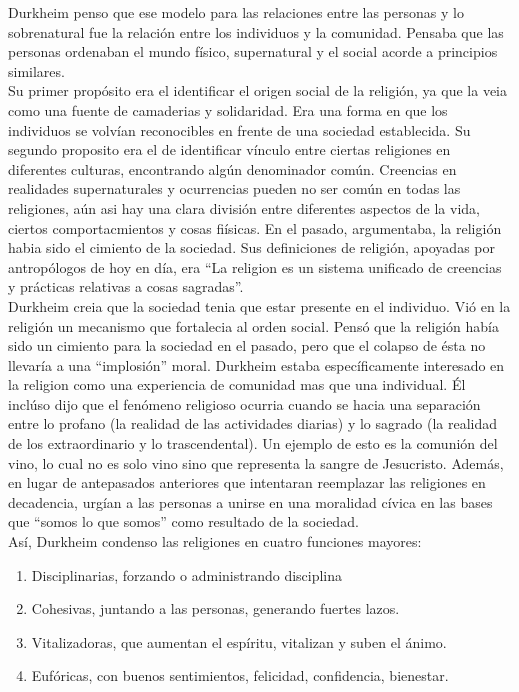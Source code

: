 Durkheim penso que ese modelo para las relaciones entre las personas y lo sobrenatural fue la relaci\'on entre los individuos y la comunidad.
Pensaba que las personas ordenaban el mundo f\'isico, supernatural y el social acorde a principios similares.\\
Su primer prop\'osito era el identificar el origen social de la religi\'on, ya que la veia como una fuente de camaderias y solidaridad. 
Era una forma en que los individuos se volv\'ian reconocibles en frente de una sociedad establecida.
Su segundo proposito era el de identificar v\'inculo entre ciertas religiones en diferentes culturas, encontrando alg\'un denominador com\'un.
Creencias en realidades supernaturales y ocurrencias pueden no ser com\'un en todas las religiones, a\'un asi hay una clara divisi\'on entre diferentes aspectos de la vida, ciertos comportacmientos y cosas fi\'isicas.
En el pasado, argumentaba, la religi\'on habia sido el cimiento de la sociedad.
Sus definiciones de religi\'on, apoyadas por antrop\'ologos de hoy en d\'ia, era ``La religion es un sistema unificado de creencias y pr\'acticas relativas a cosas sagradas''.\\

Durkheim creia que la sociedad tenia que estar presente en el individuo.
Vi\'o en la religi\'on un mecanismo que fortalecia al orden social.
Pens\'o que la religi\'on hab\'ia sido un cimiento para la sociedad en el pasado, pero que el colapso de \'esta no llevar\'ia a una ``implosi\'on'' moral.
Durkheim estaba espec\'ificamente interesado en la religion como una experiencia de comunidad mas que una individual.
\'El incl\'uso dijo que el fen\'omeno religioso ocurria cuando se hacia una separaci\'on entre lo profano (la realidad de las actividades diarias) y lo sagrado (la realidad de los extraordinario y lo trascendental).
Un ejemplo de esto es la comuni\'on del vino, lo cual no es solo vino sino que representa la sangre de Jesucristo.
Adem\'as, en lugar de antepasados anteriores que intentaran reemplazar las religiones en decadencia, urg\'ian a las personas a unirse en una moralidad c\'ivica en las bases que ``somos lo que somos'' como resultado de la sociedad.\\

As\'i, Durkheim condenso las religiones en cuatro funciones mayores:
\begin{enumerate}
	\item Disciplinarias, forzando o administrando disciplina
	\item Cohesivas, juntando a las personas, generando fuertes lazos.
	\item Vitalizadoras, que aumentan el esp\'iritu, vitalizan y suben el \'animo.
	\item Euf\'oricas, con buenos sentimientos, felicidad, confidencia, bienestar.
\end{enumerate}
\newpage
